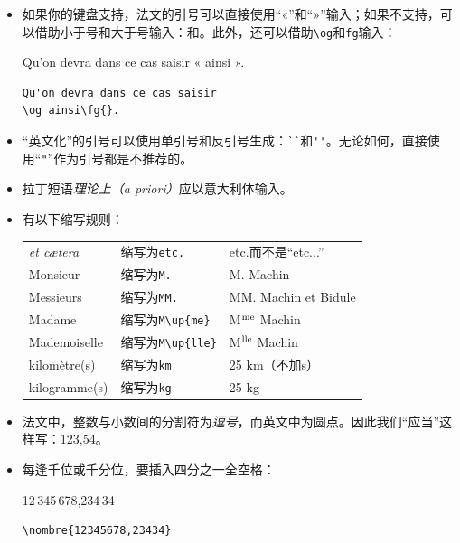 \begin{itemize}
    \item 如果你的键盘支持，法文的引号可以直接使用“«”和“»”输入；如果不支持，可以借助小于号和大于号输入：\dm{<<}和\dm{>>}。此外，还可以借助\verb|\og|和\verb|fg|输入：
    
    \begin{codelist}[7.3]{
        Qu'on devra dans ce cas saisir « ainsi ».
    }\begin{verbatim}
Qu'on devra dans ce cas saisir
\og ainsi\fg{}.
    \end{verbatim}
    \end{codelist}

    \item “英文化”的引号可以使用单引号和反引号生成：\verb|``|和\verb|''|。无论如何，直接使用“\verb|"|”作为引号都是不推荐的。
    
    \item 拉丁短语\emph{理论上（a priori）}应以意大利体输入。
    
    \item 有以下缩写规则：

    \begin{center}
        \begin{tabular}{|l|l|l|}
            \hline
            \emph{et cætera} & 缩写为\quad \verb|etc.| & etc.而不是“etc...” \\
            Monsieur & 缩写为\quad \verb|M.| & M. Machin \\
            Messieurs & 缩写为\quad \verb|MM.| & MM. Machin et Bidule\\
            Madame & 缩写为\quad \verb|M\up{me}| & M$^{\rm me}$ Machin\\
            Mademoiselle & 缩写为\quad \verb|M\up{lle}| & M$^{\rm lle}$ Machin\\
            kilomètre(s) & 缩写为\quad \verb|km| & 25 km（不加s）\\
            kilogramme(s) & 缩写为\quad \verb|kg| & 25 kg\\
            \hline
        \end{tabular}
    \end{center}

    \item 法文中，整数与小数间的分割符为\emph{逗号}，而英文中为圆点。因此我们“应当”这样写：123,54。
    
    \item 每逢千位或千分位，要插入四分之一全空格：
    \begin{codelist}[7.4]{
        12\,345\,678,234\,34
    }\begin{verbatim}
\nombre{12345678,23434}
    \end{verbatim}
    \end{codelist}


\end{itemize}
